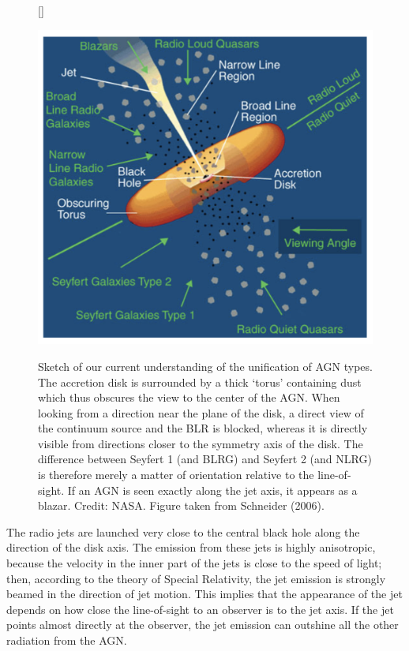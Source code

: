 \documentclass[a4paper,11pt]{article}
\begin{document}
\begin{figure}[h]
    [\FBwidth]
    {\caption{\footnotesize{Sketch of our current understanding of the unification of AGN types. The accretion disk is surrounded by a thick `torus' containing dust which thus obscures the view to the center of the AGN. When looking from a direction near the plane of the disk, a direct view of the continuum source and the BLR is blocked, whereas it is directly visible from directions closer to the symmetry axis of the disk. The difference between Seyfert 1 (and BLRG) and Seyfert 2 (and NLRG) is therefore merely a matter of orientation relative to the line-of-sight. If an AGN is seen exactly along the jet axis, it appears as a blazar. Credit: NASA. Figure taken from Schneider (2006).}}
    \label{fig:agn}}
    {\includegraphics[width=12cm]{figures/AGN.png}}
\end{figure}

{\noindent}The radio jets are launched very close to the central black hole along the direction of the disk axis. The emission from these jets is highly anisotropic, because the velocity in the inner part of the jets is close to the speed of light; then, according to the theory of Special Relativity, the jet emission is strongly beamed in the direction of jet motion. This implies that the appearance of the jet depends on how close the line-of-sight to an observer is to the jet axis. If the jet points almost directly at the observer, the jet emission can outshine all the other radiation from the AGN. 
\end{document}
